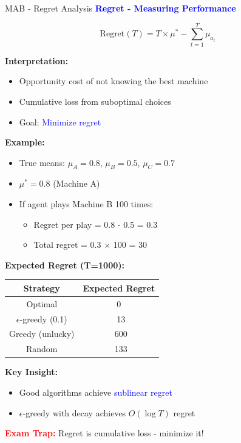 \documentclass[8pt]{beamer}
\begin{document}
	\begin{frame}{MAB - Regret Analysis}
		\fontsize{6.5}{7.5}\selectfont
		\textcolor{blue}{\textbf{Regret - Measuring Performance}}
		
		\[
		\text{Regret}(T) = T \times \mu^* - \sum_{t=1}^T \mu_{a_t}
		\]
		
		\textbf{Interpretation:}
		\begin{itemize}
			\item Opportunity cost of not knowing the best machine
			\item Cumulative loss from suboptimal choices
			\item Goal: \textcolor{blue}{Minimize regret}
		\end{itemize}
		
		\textbf{Example:}
		\begin{itemize}
			\item True means: $\mu_A = 0.8$, $\mu_B = 0.5$, $\mu_C = 0.7$
			\item $\mu^* = 0.8$ (Machine A)
			\item If agent plays Machine B 100 times:
			\begin{itemize}
				\item Regret per play = 0.8 - 0.5 = 0.3
				\item Total regret = 0.3 $\times$ 100 = 30
			\end{itemize}
		\end{itemize}
		
		\textbf{Expected Regret (T=1000):}
		\begin{tabular}{|c|c|}
			\hline
			Strategy & Expected Regret \\
			\hline
			Optimal & 0 \\
			\hline
			$\epsilon$-greedy (0.1) & ~13 \\
			\hline
			Greedy (unlucky) & ~600 \\
			\hline
			Random & ~133 \\
			\hline
		\end{tabular}
		
		\textbf{Key Insight:}
		\begin{itemize}
			\item Good algorithms achieve \textcolor{blue}{sublinear regret}
			\item $\epsilon$-greedy with decay achieves $O(\log T)$ regret
		\end{itemize}
		
		\textcolor{red}{\textbf{Exam Trap:}} Regret is cumulative loss - minimize it!
	\end{frame}
	
\end{document}
